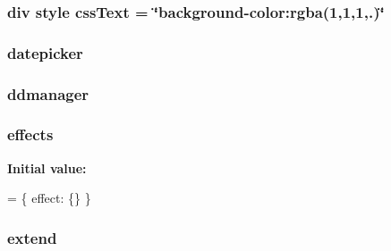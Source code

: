 \hypertarget{jquery-ui_8js_a9f4837e3f556db027bcbbafe8fcbacd3}{
\subsubsection[{css\+Text}]{\setlength{\rightskip}{0pt plus 5cm}div style css\+Text = \char`\"{}background-\/color\+:rgba(1,1,1,.)\char`\"{}}}\label{jquery-ui_8js_a9f4837e3f556db027bcbbafe8fcbacd3}
\hypertarget{jquery-ui_8js_a55e8ca2aedaee4b43f7008fc0782dfd2}{
\subsubsection[{datepicker}]{\setlength{\rightskip}{0pt plus 5cm}datepicker}}\label{jquery-ui_8js_a55e8ca2aedaee4b43f7008fc0782dfd2}
\hypertarget{jquery-ui_8js_aef3829d8c118238fc8583b6ca7200553}{
\subsubsection[{ddmanager}]{ ddmanager}}\label{jquery-ui_8js_aef3829d8c118238fc8583b6ca7200553}
\hypertarget{jquery-ui_8js_abe03c7d844b7b73e46bb0e39497d47fc}{
\subsubsection[{effects}]{\setlength{\rightskip}{0pt plus 5cm}effects}}\label{jquery-ui_8js_abe03c7d844b7b73e46bb0e39497d47fc}
{\bfseries Initial value\+:}
\begin{DoxyCode}
= \{
    effect: \{\}
\}
\end{DoxyCode}
\hypertarget{jquery-ui_8js_abe357548e1025880076c7e839a3e5755}{
\subsubsection[{extend}]{ extend}}\label{jquery-ui_8js_abe357548e1025880076c7e839a3e5755}

